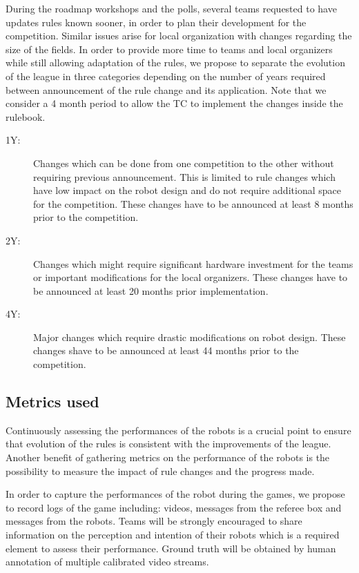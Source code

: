 \documentclass{article}
\begin{document}
During the roadmap workshops and the polls, several teams requested to have
updates rules known sooner, in order to plan their development for the
competition. Similar issues arise for local organization with changes regarding
the size of the fields. In order to provide more time to teams and local
organizers while still allowing adaptation of the rules, we propose to separate
the evolution of the league in three categories depending on the number of years
required between announcement of the rule change and its application. Note that
we consider a 4 month period to allow the TC to implement the changes inside the
rulebook.
\begin{description}
\item[1Y:] Changes which can be done from one competition to the other without
  requiring previous announcement. This is limited to rule changes which have
  low impact on the robot design and do not require additional space for the
  competition. These changes have to be announced at least 8 months prior
  to the competition.
\item[2Y:] Changes which might require significant hardware investment for the
  teams or important modifications for the local organizers. These changes have
  to be announced at least 20 months prior implementation.
\item[4Y:] Major changes which require drastic modifications on robot design.
  These changes shave to be announced at least 44 months prior to the
  competition.
\end{description}

\subsection{\label{sec:metrics}Metrics used}
Continuously assessing the performances of the robots is a crucial point to
ensure that evolution of the rules is consistent with the improvements of the league.
Another benefit of gathering metrics on the performance of the robots is the possibility to
measure the impact of rule changes and the progress made.

In order to capture the performances of the robot during the games, we propose
to record logs of the game including: videos, messages from the referee box and
messages from the robots.
Teams will be strongly encouraged to share information on the perception and
intention of their robots which is a required element to assess their performance.
Ground truth will be obtained by human annotation of multiple calibrated video streams.
\end{document}

